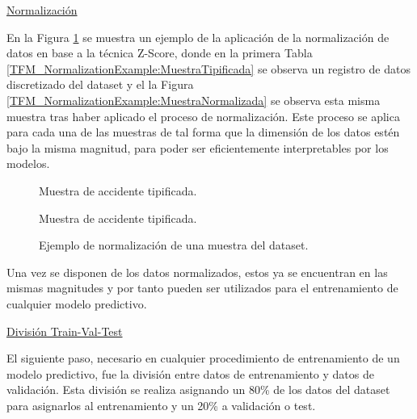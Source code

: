\documentclass{uathesis-es}
\begin{document}
\underline{Normalización}

En la Figura \ref{TFM_NormalizationExample} se muestra un ejemplo de la aplicación de la normalización de datos en base a la técnica Z-Score, donde en la primera Tabla \ref{TFM_NormalizationExample:MuestraTipificada} se observa un registro de datos discretizado del dataset y el la Figura \ref{TFM_NormalizationExample:MuestraNormalizada} se observa esta misma muestra tras haber aplicado el proceso de normalización. Este proceso se aplica para cada una de las muestras de tal forma que la dimensión de los datos estén bajo la misma magnitud, para poder ser eficientemente interpretables por los modelos.


\begin{figure}[H]
	\scriptsize
	\centering
	\renewcommand{\arraystretch}{1.4}
	
	\captionsetup{singlelinecheck = false, format= hang, justification=raggedright, font=footnotesize, labelsep=space}
	
	\begin{c}
		\centering
		
		\captionsetup{singlelinecheck = false, format= hang, justification=centering, font=footnotesize, labelsep=space}
		
		\caption{Muestra de accidente tipificada.}
		\label{TFM_NormalizationExample:MuestraTipificada}
	\end{c}
	\begin{c}
		\centering
		\csvautotabular{Figures/TFM/fatal_normalized.csv}
		
		\captionsetup{singlelinecheck = false, format= hang, justification=centering, font=footnotesize, labelsep=space}
		
		\caption{Muestra de accidente tipificada.}
		\label{TFM_NormalizationExample:MuestraNormalizada}
	\end{c}
	\caption{Ejemplo de normalización de una muestra del dataset.}
	\label{TFM_NormalizationExample}
\end{figure}%


Una vez se disponen de los datos normalizados, estos ya se encuentran en las mismas magnitudes y por tanto pueden ser utilizados para el entrenamiento de cualquier modelo predictivo.

\underline{División Train-Val-Test}

El siguiente paso, necesario en cualquier procedimiento de entrenamiento de un modelo predictivo, fue la división entre datos de entrenamiento y datos de validación. Esta división se realiza asignando un 80\% de los datos del dataset para asignarlos al entrenamiento y un 20\% a validación o test.
\end{document}
